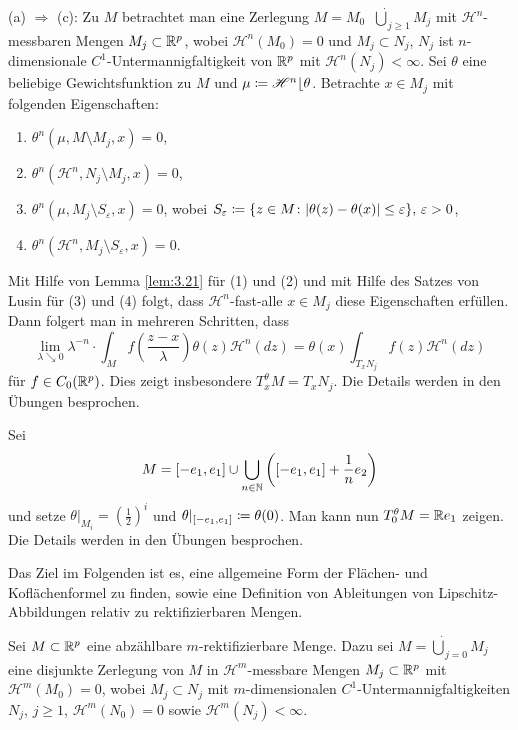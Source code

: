 \documentclass[a4paper,twoside,DIV15,BCOR12mm]{scrbook}
\newcommand{\HM}{\mathscr H}
\newcommand{\downto}{\mathrel\searrow}
\newcommand{\MR}{\lfloor}
\begin{document}
\begin{beweis}[Skizze]
(a) \(\Rightarrow\) (c): Zu \(M\) betrachtet man eine Zerlegung \(M = M_0 \mathop{\dot\cup} {\dot\bigcup}_{j\geq1} M_j\) mit \(\HM^n\)-messbaren Mengen \(M_j \subset \mathbb{R}^p\), wobei \(\HM^n(M_0)=0\) und \(M_j\subset N_j\), \(N_j\) ist \(n\)-dimensionale \(C^1\)-Unter\-mannig\-faltig\-keit von \(\mathbb{R}^p\) mit \(\HM^n(N_j)<\infty\). Sei \(\theta\) eine beliebige Gewichtsfunktion zu \(M\) und \(\mu \da \HM^n \MR \theta\). Betrachte \(x\in M_j\) mit folgenden Eigenschaften:
\begin{enumerate}[(1)]
\item \(\theta^n(\mu, M\setminus M_j, x)=0\),
\item \(\theta^n(\HM^n, N_j \setminus M_j, x) = 0\),
\item \(\theta^n(\mu, M_j \setminus S_\varepsilon, x) = 0\), wobei \(S_\varepsilon \da \{z\in M \colon |\theta(z)-\theta(x)|\leq\varepsilon\},\, \varepsilon>0\),
\item \(\theta^n(\HM^n, M_j\setminus S_\varepsilon, x)=0\).
\end{enumerate}
Mit Hilfe von Lemma \ref{lem:3.21} für (1) und (2) und mit Hilfe des Satzes von Lusin für (3) und (4) folgt, dass \(\HM^n\)-fast-alle \(x\in M_j\) diese Eigenschaften erfüllen. Dann folgert man in mehreren Schritten, dass
\[
\lim_{\lambda\downto0} \lambda^{-n} \cdot \int_M f(\frac{z-x}\lambda) \theta(z) \HM^n(dz) = \theta(x) \int_{T_x N_j} f(z) \HM^n(dz)
\]
für \(f \in C_0(\mathbb{R}^p)\). Dies zeigt insbesondere \(T_x^\theta M = T_x N_j\). Die Details werden in den Übungen 
besprochen.
\end{beweis}

\begin{beispiel} Sei
\[M = [-e_1, e_1] \cup \bigcup_{n \in \mathbb{N}} \left( [-e_1, e_1] + \frac1n e_2 \right)
\] und setze \(\theta|_{M_i} = \left(\frac12\right)^i\) und \(\theta|_{[-e_1,e_1]} \da \theta(0)\). Man kann nun \(T_0^\theta M = \mathbb{R} e_1\) zeigen.  Die Details werden in den Übungen besprochen.
\end{beispiel}

\bigskip

Das Ziel im Folgenden ist es, eine allgemeine Form der Flächen- und Koflächenformel zu finden, sowie eine Definition von Ableitungen von Lipschitz-Abbildungen relativ zu rektifizierbaren Mengen.

Sei $M\subset \mathbb{R}^p$ eine abzählbare $m$-rektifizierbare Menge. Dazu sei $M = \dot\bigcup_{j=0} M_j$ eine  disjunkte Zerlegung von $M$ in $\HM^m$-messbare Mengen $M_j\subset\mathbb{R}^p$ mit $\HM^m(M_0)=0$, wobei $M_j\subset N_j$ mit $m$-dimensionalen $C^1$-Untermannigfaltigkeiten $N_j$, $j\ge 1$, $\HM^m(N_0)=0$ sowie $\HM^m(N_j)<\infty$.
\end{document}

